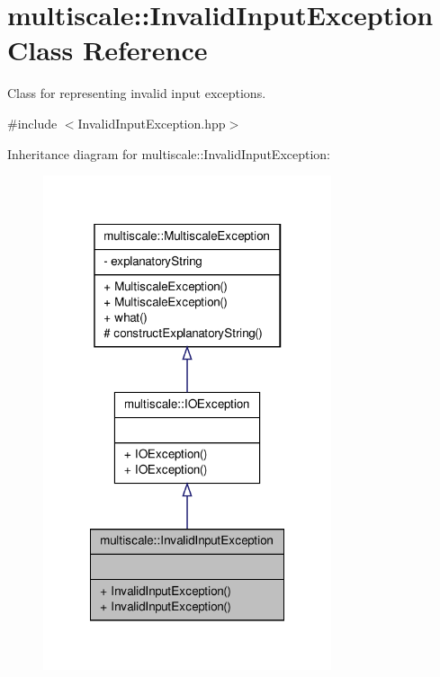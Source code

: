 \hypertarget{classmultiscale_1_1InvalidInputException}{\section{multiscale\-:\-:\-Invalid\-Input\-Exception \-Class \-Reference}
\label{classmultiscale_1_1InvalidInputException}
}


\-Class for representing invalid input exceptions.  




{\ttfamily \#include $<$\-Invalid\-Input\-Exception.\-hpp$>$}



\-Inheritance diagram for multiscale\-:\-:\-Invalid\-Input\-Exception\-:
\nopagebreak
\begin{figure}[H]
\begin{center}
\leavevmode
\includegraphics[width=240pt]{classmultiscale_1_1InvalidInputException__inherit__graph}
\end{center}
\end{figure}


